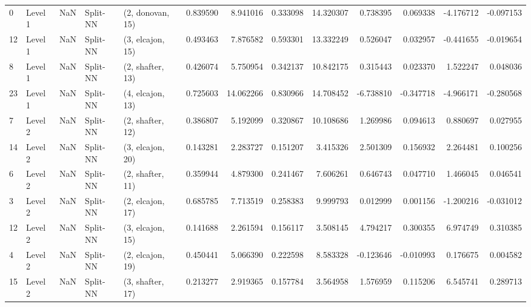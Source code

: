\begin{tabular}{llrllrrrrrrrr}
0  &   Level 1 &    NaN &       Split-NN &  (2, donovan, 15) &   0.839590 &   8.941016 &  0.333098 &  14.320307 &             0.738395 &               0.069338 &           -4.176712 &             -0.097153 \\
12 &   Level 1 &    NaN &       Split-NN &  (3, elcajon, 15) &   0.493463 &   7.876582 &  0.593301 &  13.332249 &             0.526047 &               0.032957 &           -0.441655 &             -0.019654 \\
8  &   Level 1 &    NaN &       Split-NN &  (2, shafter, 13) &   0.426074 &   5.750954 &  0.342137 &  10.842175 &             0.315443 &               0.023370 &            1.522247 &              0.048036 \\
23 &   Level 1 &    NaN &       Split-NN &  (4, elcajon, 13) &   0.725603 &  14.062266 &  0.830966 &  14.708452 &            -6.738810 &              -0.347718 &           -4.966171 &             -0.280568 \\
7  &   Level 2 &    NaN &       Split-NN &  (2, shafter, 12) &   0.386807 &   5.192099 &  0.320867 &  10.108686 &             1.269986 &               0.094613 &            0.880697 &              0.027955 \\
14 &   Level 2 &    NaN &       Split-NN &  (3, elcajon, 20) &   0.143281 &   2.283727 &  0.151207 &   3.415326 &             2.501309 &               0.156932 &            2.264481 &              0.100256 \\
6  &   Level 2 &    NaN &       Split-NN &  (2, shafter, 11) &   0.359944 &   4.879300 &  0.241467 &   7.606261 &             0.646743 &               0.047710 &            1.466045 &              0.046541 \\
3  &   Level 2 &    NaN &       Split-NN &  (2, elcajon, 17) &   0.685785 &   7.713519 &  0.258383 &   9.999793 &             0.012999 &               0.001156 &           -1.200216 &             -0.031012 \\
12 &   Level 2 &    NaN &       Split-NN &  (3, elcajon, 15) &   0.141688 &   2.261594 &  0.156117 &   3.508145 &             4.794217 &               0.300355 &            6.974749 &              0.310385 \\
4  &   Level 2 &    NaN &       Split-NN &  (2, elcajon, 19) &   0.450441 &   5.066390 &  0.222598 &   8.583328 &            -0.123646 &              -0.010993 &            0.176675 &              0.004582 \\
15 &   Level 2 &    NaN &       Split-NN &  (3, shafter, 17) &   0.213277 &   2.919365 &  0.157784 &   3.564958 &             1.576959 &               0.115206 &            6.545741 &              0.289713 \\

\end{tabular}
